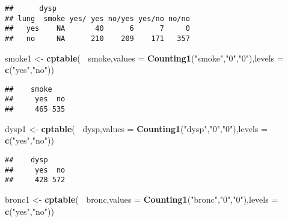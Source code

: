 \documentclass[
]{article}
\newenvironment{Shaded}{\begin{snugshade}}{\end{snugshade}}
\newcommand{\DataTypeTok}[1]{\textcolor[rgb]{0.13,0.29,0.53}{#1}}
\newcommand{\KeywordTok}[1]{\textcolor[rgb]{0.13,0.29,0.53}{\textbf{#1}}}
\newcommand{\NormalTok}[1]{#1}
\newcommand{\OperatorTok}[1]{\textcolor[rgb]{0.81,0.36,0.00}{\textbf{#1}}}
\newcommand{\StringTok}[1]{\textcolor[rgb]{0.31,0.60,0.02}{#1}}
\begin{document}
\begin{verbatim}
##      dysp
## lung  smoke yes/ yes no/yes yes/no no/no
##   yes    NA       40      6      7     0
##   no     NA      210    209    171   357
\end{verbatim}

\begin{Shaded}
\begin{Highlighting}[]
\NormalTok{smoke1 <-}\StringTok{ }\KeywordTok{cptable}\NormalTok{(}\OperatorTok{~}\StringTok{ }\NormalTok{smoke,}\DataTypeTok{values =} \KeywordTok{Counting1}\NormalTok{(}\StringTok{"smoke"}\NormalTok{,}\StringTok{"0"}\NormalTok{,}\StringTok{"0"}\NormalTok{),}\DataTypeTok{levels =} \KeywordTok{c}\NormalTok{(}\StringTok{"yes"}\NormalTok{,}\StringTok{"no"}\NormalTok{))}
\end{Highlighting}
\end{Shaded}

\begin{verbatim}
##    smoke
##     yes  no
##     465 535
\end{verbatim}

\begin{Shaded}
\begin{Highlighting}[]
\NormalTok{dysp1 <-}\StringTok{ }\KeywordTok{cptable}\NormalTok{(}\OperatorTok{~}\StringTok{ }\NormalTok{dysp,}\DataTypeTok{values =} \KeywordTok{Counting1}\NormalTok{(}\StringTok{"dysp"}\NormalTok{,}\StringTok{"0"}\NormalTok{,}\StringTok{"0"}\NormalTok{),}\DataTypeTok{levels =} \KeywordTok{c}\NormalTok{(}\StringTok{"yes"}\NormalTok{,}\StringTok{"no"}\NormalTok{))}
\end{Highlighting}
\end{Shaded}

\begin{verbatim}
##    dysp
##     yes  no
##     428 572
\end{verbatim}

\begin{Shaded}
\begin{Highlighting}[]
\NormalTok{bronc1 <-}\StringTok{ }\KeywordTok{cptable}\NormalTok{(}\OperatorTok{~}\StringTok{ }\NormalTok{bronc,}\DataTypeTok{values =} \KeywordTok{Counting1}\NormalTok{(}\StringTok{"bronc"}\NormalTok{,}\StringTok{"0"}\NormalTok{,}\StringTok{"0"}\NormalTok{),}\DataTypeTok{levels =} \KeywordTok{c}\NormalTok{(}\StringTok{"yes"}\NormalTok{,}\StringTok{"no"}\NormalTok{))}
\end{Highlighting}
\end{Shaded}
\end{document}
